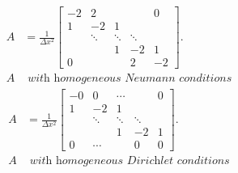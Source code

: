 \begin{multicols}{2}
\begin{equation}\label{Aneumann}
    \begin{split}
A&=\frac{1}{\Delta x^2}\begin{bmatrix}
   -2&  2&  &  & 0\\
   1&  -2&  1&  & \\
   &  \ddots&  \ddots&  \ddots& \\
   &  &  1&  -2& 1\\
   0&  &  &  2& -2
  \end{bmatrix}.\\
  A &\textit{ with homogeneous Neumann conditions}
    \end{split}
\end{equation}
\break
\begin{equation}\label{Adirichlet}
    \begin{split}
A&=\frac{1}{\Delta x^2}\begin{bmatrix}
   -0&  0& \cdots &  & 0\\
   1&  -2&  1&  & \\
   &  \ddots&  \ddots&  \ddots& \\
   &  &  1&  -2& 1\\
   0&\cdots  &  &  0& 0
  \end{bmatrix}.\\
  A & \textit{ with homogeneous Dirichlet conditions}
    \end{split}
\end{equation}
\end{multicols}
